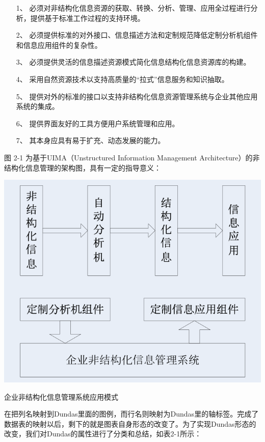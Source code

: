 \begin{enumerate}[topsep=0pt]
  \item [1、] 必须对非结构化信息资源的获取、转换、分析、管理、应用全过程进行分析，提供基于标准工作过程的支持环境。
  \item [2、] 必须提供标准的对外接口、信息描述方法和定制规范降低定制分析机组件和信息应用组件的复杂性。
  \item [3、] 必须提供灵活的信息描述资源模式简化信息结构化信息资源库的构建。
  \item [4、] 采用自然资源技术以支持高质量的“拉式”信息服务和知识抽取。
  \item [5、] 提供对外的标准的接口以支持非结构化信息资源管理系统与企业其他应用系统的集成。
  \item [6、] 提供界面友好的工具方便用户系统管理和应用。
  \item [7、] 其本身应具有易于扩充、动态发展的能力。
\end{enumerate}

图 2-1 为基于UIMA（Unstructured Information Management Architecture）的非结构化信息管理的架构图，具有一定的指导意义：

\begin{newfigure}
  \includegraphics[width=0.3\paperwidth]{figures/figure1.png}
  \caption{企业非结构化信息管理系统应用模式\cite{xdxie-1998}}
\end{newfigure}

在把列名映射到Dundas里面的图例，而行名则映射为Dundas里的轴标签。完成了数据表的映射以后，剩下的就是图表自身形态的改变了。为了实现Dundas形态的改变，我们对Dundas的属性进行了分类和总结，如表2-1所示：

